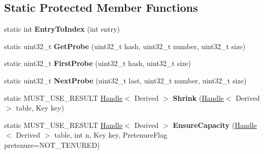 \subsection*{Static Protected Member Functions}
\begin{DoxyCompactItemize}
\item 
\hypertarget{classv8_1_1internal_1_1_hash_table_a82a15f40b786548448a96cde7486459e}{}static int {\bfseries Entry\+To\+Index} (int entry)\label{classv8_1_1internal_1_1_hash_table_a82a15f40b786548448a96cde7486459e}

\item 
\hypertarget{classv8_1_1internal_1_1_hash_table_a51696986cc87aa6cbe61d1a6188c905e}{}static uint32\+\_\+t {\bfseries Get\+Probe} (uint32\+\_\+t hash, uint32\+\_\+t number, uint32\+\_\+t size)\label{classv8_1_1internal_1_1_hash_table_a51696986cc87aa6cbe61d1a6188c905e}

\item 
\hypertarget{classv8_1_1internal_1_1_hash_table_a91210607366d3bc3c5ef8401bcf8c883}{}static uint32\+\_\+t {\bfseries First\+Probe} (uint32\+\_\+t hash, uint32\+\_\+t size)\label{classv8_1_1internal_1_1_hash_table_a91210607366d3bc3c5ef8401bcf8c883}

\item 
\hypertarget{classv8_1_1internal_1_1_hash_table_a2a5f185948292174b636fad2b3c5b021}{}static uint32\+\_\+t {\bfseries Next\+Probe} (uint32\+\_\+t last, uint32\+\_\+t number, uint32\+\_\+t size)\label{classv8_1_1internal_1_1_hash_table_a2a5f185948292174b636fad2b3c5b021}

\item 
\hypertarget{classv8_1_1internal_1_1_hash_table_af7f058d0398c45f7c6b7725911129548}{}static M\+U\+S\+T\+\_\+\+U\+S\+E\+\_\+\+R\+E\+S\+U\+L\+T \hyperlink{classv8_1_1internal_1_1_handle}{Handle}$<$ Derived $>$ {\bfseries Shrink} (\hyperlink{classv8_1_1internal_1_1_handle}{Handle}$<$ Derived $>$ table, Key key)\label{classv8_1_1internal_1_1_hash_table_af7f058d0398c45f7c6b7725911129548}

\item 
\hypertarget{classv8_1_1internal_1_1_hash_table_a2943c4720b6604cce17994f1b25ec7df}{}static M\+U\+S\+T\+\_\+\+U\+S\+E\+\_\+\+R\+E\+S\+U\+L\+T \hyperlink{classv8_1_1internal_1_1_handle}{Handle}$<$ Derived $>$ {\bfseries Ensure\+Capacity} (\hyperlink{classv8_1_1internal_1_1_handle}{Handle}$<$ Derived $>$ table, int n, Key key, Pretenure\+Flag pretenure=N\+O\+T\+\_\+\+T\+E\+N\+U\+R\+E\+D)\label{classv8_1_1internal_1_1_hash_table_a2943c4720b6604cce17994f1b25ec7df}

\end{DoxyCompactItemize}
